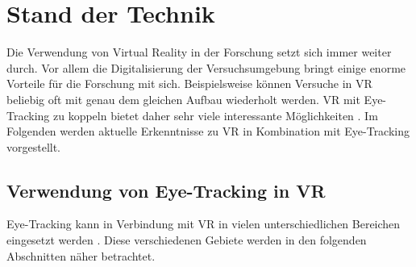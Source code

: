 
\chapter{Stand der Technik}
Die Verwendung von Virtual Reality in der Forschung setzt sich immer weiter durch. Vor allem die Digitalisierung der Versuchsumgebung bringt einige enorme Vorteile für die Forschung mit sich. Beispielsweise können Versuche in VR beliebig oft mit genau dem gleichen Aufbau wiederholt werden. VR mit Eye-Tracking zu koppeln bietet daher sehr viele interessante Möglichkeiten \cite{Clay_Koenig_Koenig_2019}. Im Folgenden werden aktuelle Erkenntnisse zu VR in Kombination mit Eye-Tracking vorgestellt.

\section{Verwendung von Eye-Tracking in VR}
Eye-Tracking kann in Verbindung mit VR in vielen unterschiedlichen Bereichen eingesetzt werden \cite{Clay_Koenig_Koenig_2019}. Diese verschiedenen Gebiete werden in den folgenden Abschnitten näher betrachtet.
